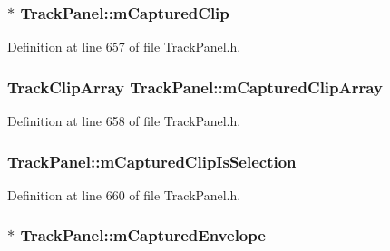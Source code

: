 \subsubsection[{\texorpdfstring{m\+Captured\+Clip}{mCapturedClip}}]{$\ast$ Track\+Panel\+::m\+Captured\+Clip\hspace{0.3cm}{\ttfamily [protected]}}\hypertarget{class_track_panel_a0c786efdea5ce22b4cba0cd0d5616e19}{}\label{class_track_panel_a0c786efdea5ce22b4cba0cd0d5616e19}


Definition at line 657 of file Track\+Panel.\+h.

\subsubsection[{\texorpdfstring{m\+Captured\+Clip\+Array}{mCapturedClipArray}}]{\setlength{\rightskip}{0pt plus 5cm}Track\+Clip\+Array Track\+Panel\+::m\+Captured\+Clip\+Array\hspace{0.3cm}{\ttfamily [protected]}}\hypertarget{class_track_panel_ad37e89caa368c3907a8d4dab00e4e34a}{}\label{class_track_panel_ad37e89caa368c3907a8d4dab00e4e34a}


Definition at line 658 of file Track\+Panel.\+h.

\subsubsection[{\texorpdfstring{m\+Captured\+Clip\+Is\+Selection}{mCapturedClipIsSelection}}]{ Track\+Panel\+::m\+Captured\+Clip\+Is\+Selection\hspace{0.3cm}{\ttfamily [protected]}}\hypertarget{class_track_panel_a14d1fdd24fac6a8e5bc3e741d3fb72ce}{}\label{class_track_panel_a14d1fdd24fac6a8e5bc3e741d3fb72ce}


Definition at line 660 of file Track\+Panel.\+h.

\subsubsection[{\texorpdfstring{m\+Captured\+Envelope}{mCapturedEnvelope}}]{$\ast$ Track\+Panel\+::m\+Captured\+Envelope\hspace{0.3cm}{\ttfamily [protected]}}\hypertarget{class_track_panel_aee4ad2084155a0cda2ec1e96cf63b30f}{}\label{class_track_panel_aee4ad2084155a0cda2ec1e96cf63b30f}


